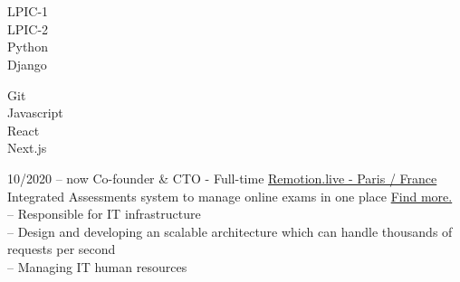\documentclass[9pt]{developercv}
\begin{document}
\\\\
\begin{minipage}[t]{0.49\textwidth}
	\Large
	\vspace{-\baselineskip}

	\faCircle \; {LPIC-1}\\
	\faCircle \; {LPIC-2}\\
	\faCircle \; {Python}\\
	\faCircle \; {Django}\\
\end{minipage}
\begin{minipage}[t]{0.50\textwidth}
	\Large
	\vspace{-\baselineskip}

	\faCircle \; {Git}\\
	\faCircle \; {Javascript}\\
	\faCircle \; {React}\\
	\faCircle \; {Next.js}\\
\end{minipage}

\hfill

\begin{entrylist}
	\entry
	{10/2020 -- now}
	{Co-founder \& CTO - Full-time}
	{\href{https://remotion.live/}{Remotion.live - Paris / France }}
	{Integrated Assessments system to manage online exams in one place  \href{https://remotion.live/}{Find more.} \\
		-- Responsible for IT infrastructure  \\
		-- Design and developing an scalable architecture which can handle thousands of requests per second \\
		-- Managing IT human resources \\
	}
\end{entrylist}
\end{document}
